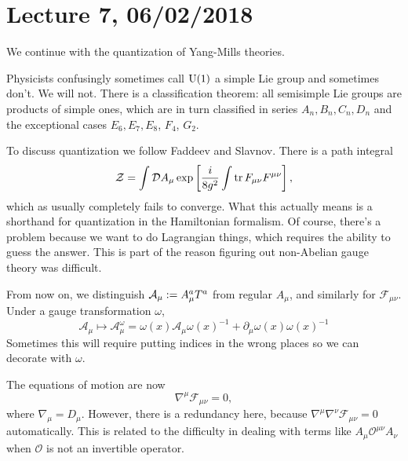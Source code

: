 \section*{Lecture 7, 06/02/2018}
We continue with the quantization of Yang-Mills theories.

Physicists confusingly sometimes call $\operatorname{U}(1)$ a simple Lie group and sometimes don't.
We will not.
There is a classification theorem: all semisimple Lie groups  are products of simple ones, which are in turn classified in series $A_n, B_n, C_n, D_n$ and the exceptional cases $E_6, E_7, E_8$, $F_4$, $G_2$.

To discuss quantization we follow Faddeev and Slavnov.
There is a path integral
\[
\mathcal Z = \int \mathcal D A_\mu \exp \left[\frac{i}{8g^2} \int \operatorname{tr} F_{\mu \nu}F^{\mu \nu}\right],
\]
which as usually completely fails to converge.
What this actually means is a shorthand for quantization in the Hamiltonian formalism.
Of course, there's a problem because we want to do Lagrangian things, which requires the ability to guess the answer.
This is part of the reason figuring out non-Abelian gauge theory was difficult.

From now on, we distinguish $\mathcal A_\mu := A_\mu^a T^a$ from regular $A_\mu$, and similarly for $\mathcal F_{\mu \nu}.$
Under a gauge transformation $\omega$,
\[
\mathcal A_\mu \mapsto \mathcal A_\mu^\omega = \omega(x) \mathcal A_\mu \omega(x)^{-1} + \partial_\mu \omega(x) \omega(x)^{-1}
\]
Sometimes this will require putting indices in the wrong places so we can decorate with $\omega$.

The equations of motion are now
\[
\nabla^\mu \mathcal F_{\mu \nu} = 0,
\]
where $\nabla_\mu = D_\mu$.
However, there is a redundancy here, because $\nabla^\mu \nabla^\nu \mathcal F_{\mu \nu} = 0$ automatically.
This is related to the difficulty in dealing with terms like $A_\mu \mathcal O^{\mu \nu} A_\nu$ when $\mathcal O$ is not an invertible operator.

